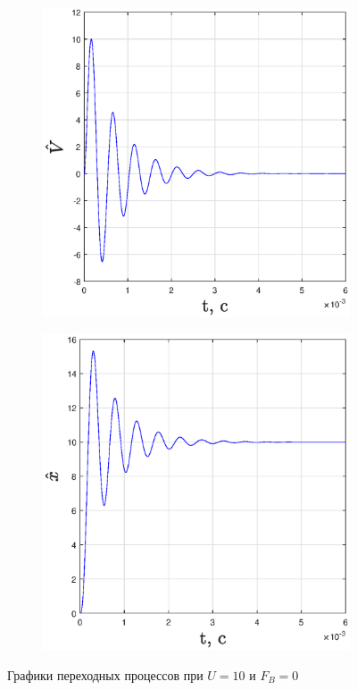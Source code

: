 \documentclass[fleqn, a4paper, 11pt, russian]{article}
\begin{document}
\begin{figure}[ht!]
		\begin{subfigure}[b]{0.49\textwidth}
			\includegraphics[width = \textwidth]{Base/baseV}
		\end{subfigure}
		\hfill
		\begin{subfigure}[b]{0.49\textwidth}
			\includegraphics[width = \textwidth]{Base/baseX}
		\end{subfigure}
		\caption{Графики переходных процессов при $U = 10$ и $F_B = 0$}
		\label{baseTP}
	\end{figure}
	\clearpage
\end{document}
